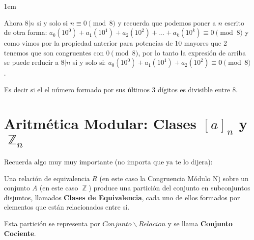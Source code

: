 \documentclass[12pt, fleqn]{report}                             %
\newenvironment{SmallIndentation}[1][0.75em]                    %
    {\begin{adjustwidth}{#1}{}\begin{footnotesize}}                 %
    {\end{footnotesize}\end{adjustwidth}}                           %
\DeclareMathOperator \Integers  {\mathbb{Z}}                     %
\begin{document}
\begin{itemize}
\begin{SmallIndentation}[1em]
                        Ahora $8|n$ si y solo si $n \equiv 0 \pmod{8}$ y recuerda
                        que podemos poner a $n$ escrito de otra forma:
                        $a_0(10^0) + a_1(10^1) + a_2(10^2) + \dots + a_k(10^k) \equiv 0 \pmod{8}$
                        y como vimos por la propiedad anterior para potencias de 10 mayores que
                        2 tenemos que son congruentes con $0 \pmod{8}$, por lo tanto la
                        expresión de arriba se puede reducir a $8|n$ si y solo si: 
                        $a_0(10^0) + a_1(10^1) + a_2(10^2) \equiv 0 \pmod{8}$.

                        Es decir si el el número formado por sus últimos 3 dígitos es divisible
                        entre 8.

                    \end{SmallIndentation}

            \end{itemize}



















    \clearpage
    \section{Aritmética Modular: Clases $[a]_n$ y $\Integers_n$}

        Recuerda algo muy muy importante (no importa que ya te lo dijera):

        Una relación de equivalencia $R$ (en este caso la Congruencia Módulo N)
        sobre un conjunto $A$ (en este caso $\Integers$) produce una partición
        del conjunto en subconjuntos disjuntos, llamados \textbf{Clases de
        Equivalencia}, cada uno de ellos formados por elementos que están
        relacionados entre sí.

        Esta partición se representa por $Conjunto \backslash Relacion$ y se llama
        \textbf{Conjunto Cociente}.


\end{document}
